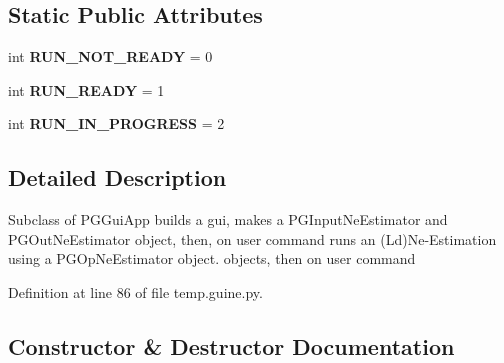 \subsection*{Static Public Attributes}
\begin{DoxyCompactItemize}
\item 
int {\bfseries R\+U\+N\+\_\+\+N\+O\+T\+\_\+\+R\+E\+A\+DY} = 0\hypertarget{classnegui_1_1temp_1_1PGGuiNeEstimator_aa0f8f1a4c0207cf166f87ce338ce8a00}{}\label{classnegui_1_1temp_1_1PGGuiNeEstimator_aa0f8f1a4c0207cf166f87ce338ce8a00}

\item 
int {\bfseries R\+U\+N\+\_\+\+R\+E\+A\+DY} = 1\hypertarget{classnegui_1_1temp_1_1PGGuiNeEstimator_adb10cacc77cba1cc39cc653236344445}{}\label{classnegui_1_1temp_1_1PGGuiNeEstimator_adb10cacc77cba1cc39cc653236344445}

\item 
int {\bfseries R\+U\+N\+\_\+\+I\+N\+\_\+\+P\+R\+O\+G\+R\+E\+SS} = 2\hypertarget{classnegui_1_1temp_1_1PGGuiNeEstimator_a00a90e3ba81f90c0980f4b4f576369e1}{}\label{classnegui_1_1temp_1_1PGGuiNeEstimator_a00a90e3ba81f90c0980f4b4f576369e1}

\end{DoxyCompactItemize}


\subsection{Detailed Description}
\begin{DoxyVerb}Subclass of PGGuiApp builds a gui,
makes a PGInputNeEstimator and PGOutNeEstimator 
object, then, on user command runs an (Ld)Ne-Estimation
using a PGOpNeEstimator object.
objects, then on user command   
\end{DoxyVerb}
 

Definition at line 86 of file temp.\+guine.\+py.



\subsection{Constructor \& Destructor Documentation}
